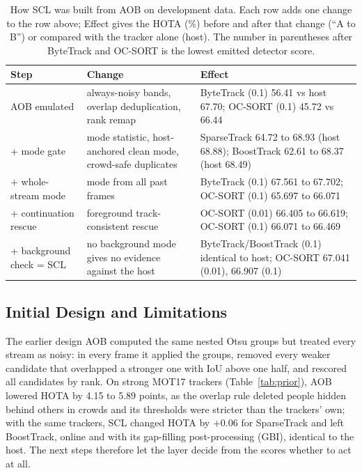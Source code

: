\documentclass[pdflatex,sn-mathphys-num,iicol]{sn-jnl}
\newcommand{\scl}{SCL}
\newcommand{\aob}{AOB}
\begin{document}
\begin{table}[!tp]
\caption{How \scl{} was built from \aob{} on development data. Each row adds one change to the row above; Effect gives the HOTA (\%) before and after that change (``A to B'') or compared with the tracker alone (host). The number in parentheses after ByteTrack and OC-SORT is the lowest emitted detector score.}
\label{tab:ablation}
\centering\footnotesize
\setlength{\tabcolsep}{4pt}
\begin{tabular}{@{}>{\raggedright\arraybackslash}p{30mm}>{\raggedright\arraybackslash}p{48mm}>{\raggedright\arraybackslash}p{74mm}@{}}
\toprule
Step & Change & Effect\\
\midrule
\aob{} emulated & always-noisy bands, overlap deduplication, rank remap & ByteTrack (0.1) 56.41 vs host 67.70; OC-SORT (0.1) 45.72 vs 66.44\\
+ mode gate & mode statistic, host-anchored clean mode, crowd-safe duplicates & SparseTrack 64.72 to 68.93 (host 68.88); BoostTrack 62.61 to 68.37 (host 68.49)\\
+ whole-stream mode & mode from all past frames & ByteTrack (0.1) 67.561 to 67.702; OC-SORT (0.1) 65.697 to 66.071\\
+ continuation rescue & foreground track-consistent rescue & OC-SORT (0.01) 66.405 to 66.619; OC-SORT (0.1) 66.071 to 66.469\\
+ background check = \scl{} & no background mode gives no evidence against the host & ByteTrack/BoostTrack (0.1) identical to host; OC-SORT 67.041 (0.01), 66.907 (0.1)\\
\bottomrule
\end{tabular}
\end{table}
\subsection{Initial Design and Limitations}\label{sec:prior}
The earlier design \aob{} computed the same nested Otsu groups but treated every stream as noisy:
in every frame it applied the groups, removed every weaker candidate that overlapped a stronger one
with IoU above one half, and rescored all candidates by rank. On strong MOT17 trackers
(Table~\ref{tab:prior}), \aob{} lowered HOTA by 4.15 to 5.89 points, as the overlap rule deleted
people hidden behind others in crowds and its thresholds were stricter than the trackers' own; with
the same trackers, \scl{} changed HOTA by $+0.06$ for SparseTrack and left BoostTrack, online and with
its gap-filling post-processing (GBI), identical to the host. The next steps therefore let the layer
decide from the scores whether to act at all.
\end{document}
